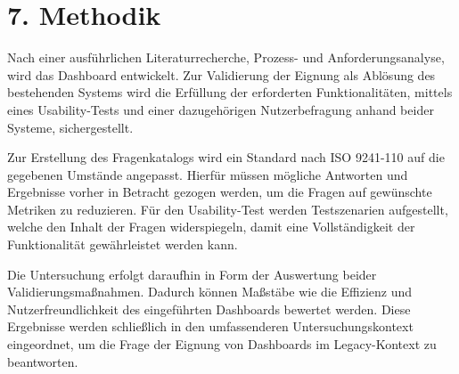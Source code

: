 \section*{7. Methodik}
Nach einer ausführlichen Literaturrecherche, Prozess- und Anforderungsanalyse, wird das Dashboard entwickelt. Zur Validierung der Eignung als Ablösung des bestehenden Systems wird die Erfüllung der erforderten Funktionalitäten, mittels eines Usability-Tests und einer dazugehörigen Nutzerbefragung anhand beider Systeme, sichergestellt.

Zur Erstellung des Fragenkatalogs wird ein Standard nach ISO 9241-110 auf die gegebenen Umstände angepasst. Hierfür müssen mögliche Antworten und Ergebnisse vorher in Betracht gezogen werden, um die Fragen auf gewünschte Metriken zu reduzieren. Für den Usability-Test werden Testszenarien aufgestellt, welche den Inhalt der Fragen widerspiegeln, damit eine Vollständigkeit der Funktionalität gewährleistet werden kann.

Die Untersuchung erfolgt daraufhin in Form der Auswertung beider Validierungsmaßnahmen. Dadurch können Maßstäbe wie die Effizienz und Nutzerfreundlichkeit des eingeführten Dashboards bewertet werden. Diese Ergebnisse werden schließlich in den umfassenderen Untersuchungskontext eingeordnet, um die Frage der Eignung von Dashboards im Legacy-Kontext zu beantworten.
